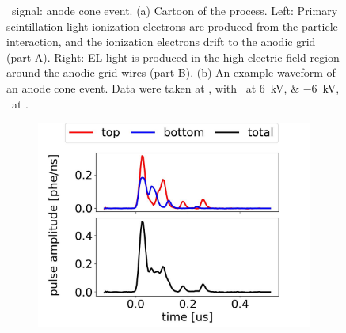 \begin{figure}[!htbp]
\begin{subfigure}[b]{0.7\textwidth}
		\caption{}
		\label{fig:anode cone c}
	\end{subfigure}
	\caption[\gtest\ signal: anode cone event.]{\gtest\ signal: anode cone event. (a) Cartoon of the process. Left: Primary scintillation light  ionization electrons are produced from the particle interaction, and the ionization electrons drift to the anodic grid (part A). Right: EL light is produced in the high electric field region around the anodic grid wires (part B). (b) An example waveform of an anode cone event. Data were taken at , with \opvtvb\ at \SIlist{+6;-6}{kV}, \opgd\ at \standarddensity .}
	\label{fig:anode cone}
\end{figure}

\begin{figure}[!htbp]\ContinuedFloat
	\centering
	\begin{subfigure}[b]{0.7\textwidth}
		\centering
		\includegraphics[width=\figurewidth,clip,trim={0 0 0 0}]{Figures/GasTest/exampleWaveforms/proc64767AnodeCone1P1.jpg}
		\caption{}
		\label{fig:anode cone d}
	\end{subfigure}
	\par\bigskip
	\begin{subfigure}[b]{0.7\textwidth}
		\centering

\end{subfigure}
\end{figure}
